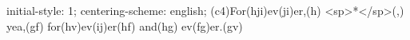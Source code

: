 initial-style: 1;
centering-scheme: english;
(c4)For(hji)ev(ji)er,(h) <sp>*</sp>(,) yea,(gf) for(hv)ev(ij)er(hf) and(hg) ev(fg)er.(gv)
